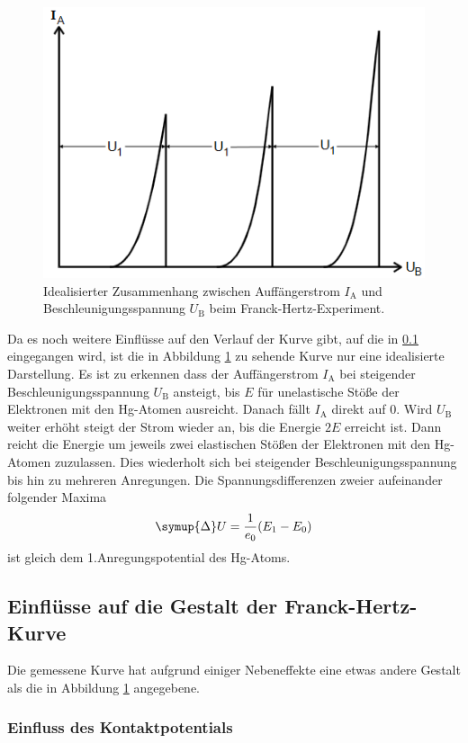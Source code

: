 \begin{figure}
    \centering
    \caption{Idealisierter Zusammenhang zwischen Auffängerstrom $I_\text{A}$ und Beschleunigungsspannung $U_\text{B}$ beim Franck-Hertz-Experiment.\cite{v601}}
    \label{fig:id}
    \includegraphics[width = 0.6 \textwidth]{pics/ideal.png}
\end{figure}
Da es noch weitere Einflüsse auf den Verlauf der Kurve gibt, auf die in \ref{subsec:einflüsse} eingegangen wird, ist die in Abbildung \ref{fig:id} zu sehende Kurve nur eine idealisierte Darstellung.
Es ist zu erkennen dass der Auffängerstrom $I_\text{A}$ bei steigender Beschleunigungsspannung $U_\text{B}$ ansteigt, bis $E$ für unelastische Stöße der Elektronen mit den Hg-Atomen ausreicht. Danach fällt $I_\text{A}$ direkt auf 0.
Wird $U_\text{B}$ weiter erhöht steigt der Strom wieder an, bis die Energie $2E$ erreicht ist. Dann reicht die Energie um jeweils zwei elastischen Stößen der Elektronen mit den Hg-Atomen zuzulassen. Dies
wiederholt sich bei steigender Beschleunigungsspannung bis hin zu mehreren Anregungen.
Die Spannungsdifferenzen zweier aufeinander folgender Maxima
\begin{equation}
    \symup{\Delta}U= \frac{1}{e_0} (E_1- E_0)
\end{equation}
ist gleich dem 1.Anregungspotential des Hg-Atoms.

\subsection{Einflüsse auf die Gestalt der Franck-Hertz-Kurve}
\label{subsec:einflüsse}

Die gemessene Kurve hat aufgrund einiger Nebeneffekte eine etwas andere Gestalt als die in Abbildung \ref{fig:id} angegebene.

\subsubsection{Einfluss des Kontaktpotentials}

